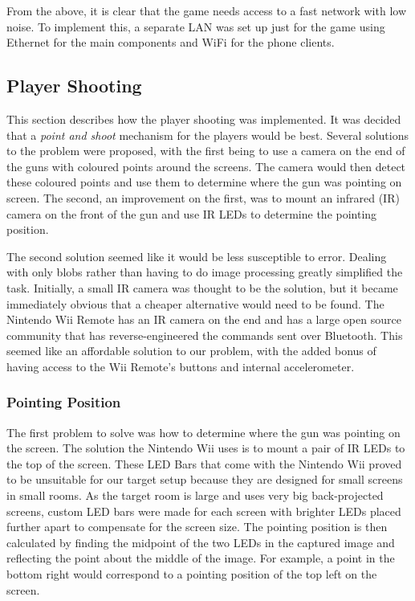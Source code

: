 \documentclass[a4paper,11pt]{article}
\begin{document}
From the above, it is clear that the game needs access to a fast network with low noise. To implement this, a separate LAN was set up just for the game using Ethernet for the main components and WiFi for the phone clients.

\subsection{Player Shooting}

This section describes how the player shooting was implemented. It was decided that a \emph{point and shoot} mechanism for the players would be best. Several solutions to the problem were proposed, with the first being to use a camera on the end of the guns with coloured points around the screens. The camera would then detect these coloured points and use them to determine where the gun was pointing on screen. The second, an improvement on the first, was to mount an infrared (IR) camera on the front of the gun and use IR LEDs to determine the pointing position. 

The second solution seemed like it would be less susceptible to error. Dealing with only blobs rather than having to do image processing greatly simplified the task. Initially, a small IR camera was thought to be the solution, but it became immediately obvious that a cheaper alternative would need to be found. The Nintendo Wii Remote has an IR camera on the end and has a large open source community that has reverse-engineered the commands sent over Bluetooth\cite{wiibrew_wiimote}. This seemed like an affordable solution to our problem, with the added bonus of having access to the Wii Remote's buttons and internal accelerometer. 

\subsubsection{Pointing Position}
The first problem to solve was how to determine where the gun was pointing on the screen. The solution the Nintendo Wii uses is to mount a pair of IR LEDs to the top of the screen. These LED Bars that come with the Nintendo Wii proved to be unsuitable for our target setup because they are designed for small screens in small rooms. As the target room is large and uses very big back-projected screens, custom LED bars were made for each screen with brighter LEDs placed further apart to compensate for the screen size. The pointing position is then calculated by finding the midpoint of the two LEDs in the captured image and reflecting the point about the middle of the image. For example, a point in the bottom right would correspond to a pointing position of the top left on the screen.
\end{document}
